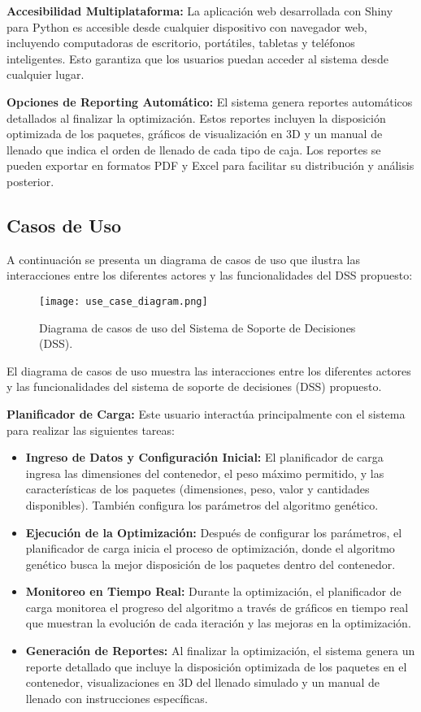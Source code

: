 \documentclass[9pt,a4paper]{rho}
\begin{document}
\textbf{Accesibilidad Multiplataforma:} La aplicación web desarrollada con Shiny para Python es accesible desde cualquier dispositivo con navegador web, incluyendo computadoras de escritorio, portátiles, tabletas y teléfonos inteligentes. Esto garantiza que los usuarios puedan acceder al sistema desde cualquier lugar.

\textbf{Opciones de Reporting Automático:} El sistema genera reportes automáticos detallados al finalizar la optimización. Estos reportes incluyen la disposición optimizada de los paquetes, gráficos de visualización en 3D y un manual de llenado que indica el orden de llenado de cada tipo de caja. Los reportes se pueden exportar en formatos PDF y Excel para facilitar su distribución y análisis posterior.

\subsection{Casos de Uso}
A continuación se presenta un diagrama de casos de uso que ilustra las interacciones entre los diferentes actores y las funcionalidades del DSS propuesto:

\begin{figure}[h!]
    \centering
    \texttt{[image: use\_case\_diagram.png]}
    \caption{Diagrama de casos de uso del Sistema de Soporte de Decisiones (DSS).}
    \label{fig:use_case_diagram}
\end{figure}

El diagrama de casos de uso muestra las interacciones entre los diferentes actores y las funcionalidades del sistema de soporte de decisiones (DSS) propuesto.

\textbf{Planificador de Carga:} Este usuario interactúa principalmente con el sistema para realizar las siguientes tareas:
\begin{itemize}
    \item \textbf{Ingreso de Datos y Configuración Inicial:} El planificador de carga ingresa las dimensiones del contenedor, el peso máximo permitido, y las características de los paquetes (dimensiones, peso, valor y cantidades disponibles). También configura los parámetros del algoritmo genético.
    \item \textbf{Ejecución de la Optimización:} Después de configurar los parámetros, el planificador de carga inicia el proceso de optimización, donde el algoritmo genético busca la mejor disposición de los paquetes dentro del contenedor.
    \item \textbf{Monitoreo en Tiempo Real:} Durante la optimización, el planificador de carga monitorea el progreso del algoritmo a través de gráficos en tiempo real que muestran la evolución de cada iteración y las mejoras en la optimización.
    \item \textbf{Generación de Reportes:} Al finalizar la optimización, el sistema genera un reporte detallado que incluye la disposición optimizada de los paquetes en el contenedor, visualizaciones en 3D del llenado simulado y un manual de llenado con instrucciones específicas.
\end{itemize}
\end{document}

